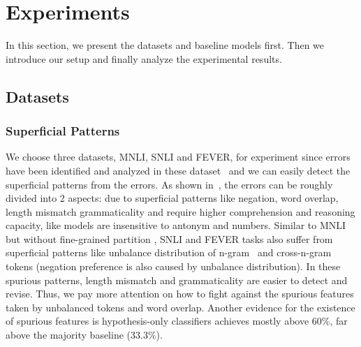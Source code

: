 \section{Experiments}
\label{sec:experiments}

In this section, we present the datasets and baseline models first. Then we introduce our setup 
and finally analyze the experimental results.

\subsection{Datasets}
\label{sec:dataset}

\subsubsection{Superficial Patterns}
\label{sec:patterns}
We choose three datasets, MNLI, SNLI and FEVER, for experiment since 
errors have been identified and analyzed in these dataset~\cite{} and 
we can easily detect the superficial patterns from the errors. 
As shown in~, the errors can be roughly divided into 2 aspects: 
due to superficial patterns like negation, word overlap, length mismatch 
grammaticality and require higher comprehension and reasoning capacity, like 
models are insensitive to antonym and numbers. 
Similar to MNLI but without fine-grained partition 
, SNLI and FEVER tasks also suffer 
from superficial patterns like unbalance distribution of n-gram~\cite{} and
cross-n-gram tokens (negation preference is also caused by unbalance distribution). 
In these spurious  patterns, length mismatch and 
grammaticality are easier to detect and revise. Thus, we pay more attention on 
how to fight against the spurious features taken by unbalanced tokens and word overlap. 
Another evidence for the existence of spurious features is hypothesis-only classifiers
achieves mostly above 60\%, far above the majority
baseline (33.3\%).


